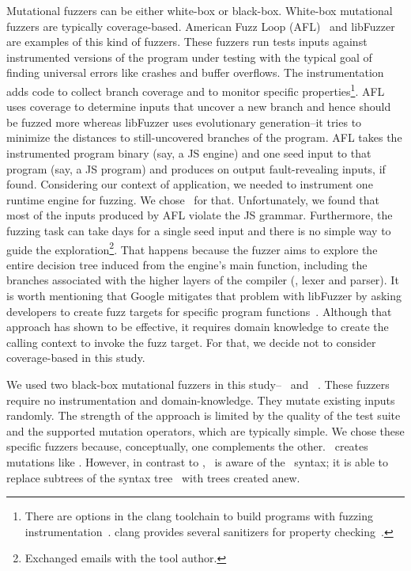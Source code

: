\documentclass[sigconf,review, anonymous]{acmart}
\begin{document}

Mutational fuzzers can be either white-box or black-box. White-box
mutational fuzzers are typically coverage-based. American Fuzz Loop
(AFL)~\cite{afl} and libFuzzer~\cite{libfuzzer} are examples of this
kind of fuzzers. These fuzzers run tests inputs against instrumented
versions of the program under testing with the typical goal of finding
universal errors like crashes and buffer overflows. The instrumentation
adds code to collect branch coverage and to monitor specific
properties\footnote{There are options in the clang toolchain to build
  programs with fuzzing instrumentation~\cite{libfuzzer}. clang
  provides several sanitizers for property
  checking~\cite{clang-documentation}.}. AFL uses coverage to determine
inputs that uncover a new branch and hence should be fuzzed more
whereas libFuzzer uses evolutionary generation--it tries to minimize
the distances to still-uncovered branches of the program. AFL takes
the instrumented program binary (say, a JS engine) and one seed input
to that program (say, a JS program) and produces on output
fault-revealing inputs, if found. Considering our context of
application, we needed to instrument one runtime engine for fuzzing.
We chose \veight\ for that. Unfortunately, we found that most of the inputs produced
by AFL violate the JS grammar. Furthermore, the fuzzing task can take
days for a single seed input and there is no simple way to guide the
exploration\footnote{Exchanged emails with the tool author.}. That
happens because the fuzzer aims to explore the entire decision tree
induced from the engine's main function, including the branches
associated with the higher layers of the compiler (\eg{}, lexer and
parser). It is worth mentioning that Google mitigates that problem
with libFuzzer by asking developers to create fuzz targets for
specific program
functions~\cite{libFuzzer-tutorial-google,libFuzzer-chromium-google}. Although
that approach has shown to be effective, it requires domain knowledge
to create the calling context to invoke the fuzz target. For that, we
decide not to consider coverage-based in this study.

We used two black-box mutational fuzzers in this
study--\radamsa~\cite{radamsa} and \quickfuzz~\cite{quickfuzz}. These
fuzzers require no instrumentation and domain-knowledge. They mutate
existing inputs randomly. The strength of the approach is
limited by the quality of the test suite and the supported mutation
operators, which are typically simple. We chose these specific fuzzers
because, conceptually, one complements the other. \quickfuzz\ creates
mutations like \radamsa. However, in contrast to \radamsa, \quickfuzz\ is aware
of the \js\ syntax; it is able to replace subtrees of the syntax
tree~\cite{grieco2016quickfuzz} with trees created anew.
\end{document}
